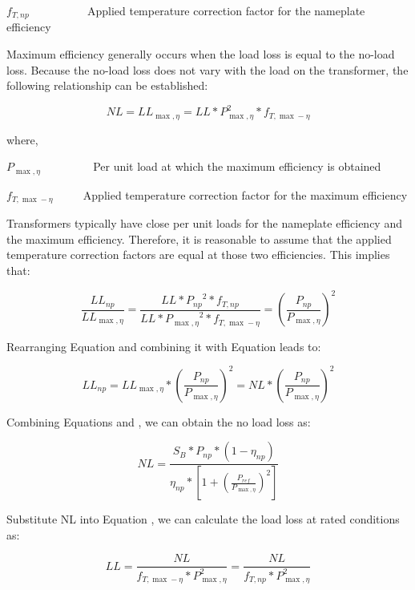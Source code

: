 \({f_{T,np}}\) ~~~~~~~~~ Applied temperature correction factor for the nameplate efficiency

Maximum efficiency generally occurs when the load loss is equal to the no-load loss. Because the no-load loss does not vary with the load on the transformer, the following relationship can be established:

\begin{equation}
NL = L{L_{\max ,\eta }} = LL*P_{\max ,\eta }^2*{f_{T,\max  - \eta }}
\end{equation}

where,

\({P_{\max ,\eta }}\) ~~~~~~~~ Per unit load at which the maximum efficiency is obtained

\({f_{T,\max - \eta }}\) ~~~~ Applied temperature correction factor for the maximum efficiency

Transformers typically have close per unit loads for the nameplate efficiency and the maximum efficiency. Therefore, it is reasonable to assume that the applied temperature correction factors are equal at those two efficiencies. This implies that:

\begin{equation}
\frac{{L{L_{np}}}}{{L{L_{\max ,\eta }}}} = \frac{{LL*{P_{np}}^2*{f_{T,np}}}}{{LL*{P_{\max ,\eta }}^2*{f_{T,\max  - \eta }}}} = {\left( {\frac{{{P_{np}}}}{{{P_{\max ,\eta }}}}} \right)^2}
\end{equation}

Rearranging Equation and combining it with Equation leads to:

\begin{equation}
L{L_{np}} = L{L_{\max ,\eta }}*{\left( {\frac{{{P_{np}}}}{{{P_{\max ,\eta }}}}} \right)^2} = NL*{\left( {\frac{{{P_{np}}}}{{{P_{\max ,\eta }}}}} \right)^2}
\end{equation}

Combining Equations and , we can obtain the no load loss as:

\begin{equation}
NL = \frac{{{S_B}*{P_{np}}*(1 - {\eta_{np}})}}{{{\eta_{np}}*\left[ {1 + {{\left( {\frac{{{P_{ref}}}}{{P{}_{\max ,\eta }}}} \right)}^2}} \right]}}
\end{equation}

Substitute NL into Equation , we can calculate the load loss at rated conditions as:

\begin{equation}
LL = \frac{{NL}}{{{f_{T,\max  - \eta }}*P_{\max ,\eta }^2}} = \frac{{NL}}{{{f_{T,np}}*P_{\max ,\eta }^2}}
\end{equation}

